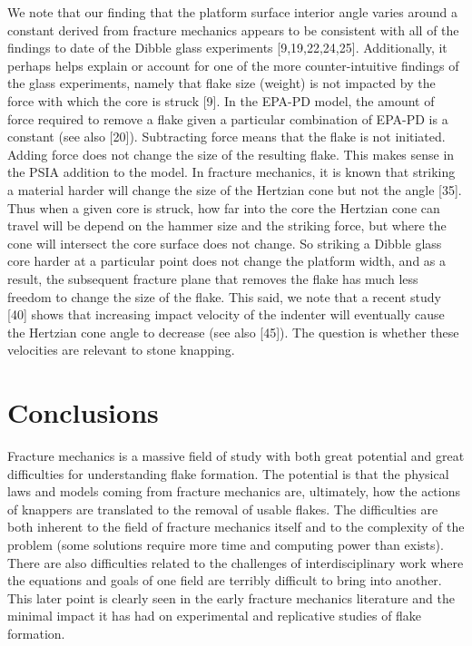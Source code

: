 \documentclass[10pt,letterpaper]{article}
\begin{document}
We note that our finding that the platform surface interior angle varies
around a constant derived from fracture mechanics appears to be
consistent with all of the findings to date of the Dibble glass
experiments {[}9,19,22,24,25{]}. Additionally, it perhaps helps explain
or account for one of the more counter-intuitive findings of the glass
experiments, namely that flake size (weight) is not impacted by the
force with which the core is struck {[}9{]}. In the EPA-PD model, the
amount of force required to remove a flake given a particular
combination of EPA-PD is a constant (see also {[}20{]}). Subtracting
force means that the flake is not initiated. Adding force does not
change the size of the resulting flake. This makes sense in the PSIA
addition to the model. In fracture mechanics, it is known that striking
a material harder will change the size of the Hertzian cone but not the
angle {[}35{]}. Thus when a given core is struck, how far into the core
the Hertzian cone can travel will be depend on the hammer size and the
striking force, but where the cone will intersect the core surface does
not change. So striking a Dibble glass core harder at a particular point
does not change the platform width, and as a result, the subsequent
fracture plane that removes the flake has much less freedom to change
the size of the flake. This said, we note that a recent study {[}40{]}
shows that increasing impact velocity of the indenter will eventually
cause the Hertzian cone angle to decrease (see also {[}45{]}). The
question is whether these velocities are relevant to stone knapping.

\hypertarget{conclusions}{%
\section{Conclusions}\label{conclusions}}

Fracture mechanics is a massive field of study with both great potential
and great difficulties for understanding flake formation. The potential
is that the physical laws and models coming from fracture mechanics are,
ultimately, how the actions of knappers are translated to the removal of
usable flakes. The difficulties are both inherent to the field of
fracture mechanics itself and to the complexity of the problem (some
solutions require more time and computing power than exists). There are
also difficulties related to the challenges of interdisciplinary work
where the equations and goals of one field are terribly difficult to
bring into another. This later point is clearly seen in the early
fracture mechanics literature and the minimal impact it has had on
experimental and replicative studies of flake formation.
\end{document}
